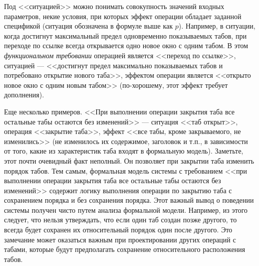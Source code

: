 \documentclass[14pt, twoside]{extreport}
\begin{document}
Под <<ситуацией>> можно понимать совокупность значений входных параметров, некие условия, при которых эффект операции обладает заданной спецификой (ситуация обозначена в формуле выше как $p$). Например, в ситуации, когда достигнут максимальный предел одновременно показываемых табов, при переходе по ссылке всегда открывается одно новое окно с одним табом. В этом \emph{функциональном требовании} операцией является <<переход по ссылке>>, ситуацией --- <<достигнут предел максимально показываемых табов и потребовано открытие нового таба>>, эффектом операции является <<открыто новое окно с одним новым табом>> (по-хорошему, этот эффект требует дополнения).

Еще несколько примеров. <<При выполнении операции закрытия таба все остальные табы остаются без изменений>> --- ситуация <<таб открыт>>, операция <<закрытие таба>>, эффект <<все табы, кроме закрываемого, не изменились>> (не изменилось их содержимое, заголовок и т.п., в зависимости от того, какие из характеристик таба входят в формальную модель). Заметьте, этот почти очевидный факт неполный. Он позволяет при закрытии таба изменить порядок табов. Тем самым, формальная модель системы с требованием <<при выполнении операции закрытия таба все остальные табы остаются без изменений>> содержит логику выполнения операции по закрытию таба с сохранением порядка и без сохранения порядка. Этот важный вывод о поведении системы получен чисто путем анализа формальной модели. Например, из этого следует, что нельзя утверждать, что если один таб создан позже другого, то всегда будет сохранен их относительный порядок один после другого. Это замечание может оказаться важным при проектировании других операций с табами, которые будут предполагать сохранение относительного расположения табов.
\end{document}
